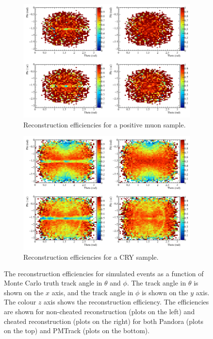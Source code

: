 \begin{figure}[h!]
  \centering
  \begin{subfigure}{0.8\textwidth}
    \centering
    \includegraphics[width=\textwidth]{Effic_AntiMuon_500V_All_PhiTheta}
    \caption{Reconstruction efficiencies for a positive muon sample.}
    \label{fig:SimEffic_ThetaPhi_AMu}
  \end{subfigure}
  \begin{subfigure}{0.8\textwidth}
    \centering
    \includegraphics[width=\textwidth]{Effic_Cosmics_500V_All_PhiTheta}
    \caption{Reconstruction efficiencies for a CRY sample.}
    \label{fig:SimEffic_ThetaPhi_CRY}
  \end{subfigure}
  \caption[The reconstruction efficiencies for simulated events as a function of Monte Carlo truth track angle in $\theta$ and $\phi$.]
          {The reconstruction efficiencies for simulated events as a function of Monte Carlo truth track angle in $\theta$ and $\phi$. The track angle in $\theta$ is shown on the $x$ axis, and the track angle in $\phi$ is shown on the $y$ axis. The colour $z$ axis shows the reconstruction efficiency. The efficiencies are shown for non-cheated reconstruction (plots on the left) and cheated reconstruction (plots on the right) for both Pandora (plots on the top) and PMTrack (plots on the bottom).}
          \label{fig:SimEffic_ThetaPhi}
\end{figure}

